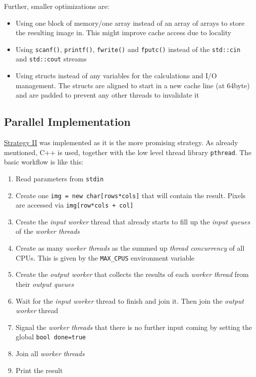 Further, smaller optimizations are:
\begin{itemize}
    \item Using one block of memory/one array instead of an array of arrays to store the resulting image in. This might improve cache access due to locality
    \item Using \verb$scanf()$, \verb$printf()$, \verb$fwrite()$ and \verb$fputc()$ instead of the \verb$std::cin$ and \verb$std::cout$ streams
    \item Using structs instead of any variables for the calculations and I/O management. The structs are aligned to start in a new cache line (at 64byte) and are padded to prevent any other threads to invalidate it
\end{itemize}


\subsection{Parallel Implementation}
\label{ssec:parallel_implementation}

\hyperref[ssec:strategy-ii]{Strategy II} was implemented as it is the more promising strategy. As already mentioned, C++ is used, together with the low level thread library \verb$pthread$. The basic workflow is like this:

\begin{enumerate}
    \item Read parameters from \verb$stdin$
    \item Create one \verb$img = new char[rows*cols]$ that will contain the result. Pixels are accessed via \verb$img[row*cols + col]$
    \item Create the \textit{input worker} thread that already starts to fill up the \textit{input queues} of the \textit{worker threads}
    \item Create as many \textit{worker threads} as the summed up \textit{thread concurrency} of all CPUs. This is given by the \verb$MAX_CPUS$ environment variable
    \item Create the \textit{output worker} that collects the results of each \textit{worker thread} from their \textit{output queues}
    \item Wait for the \textit{input worker} thread to finish and join it. Then join the \textit{output worker} thread
    \item Signal the \textit{worker threads} that there is no further input coming by setting the global \verb$bool done=true$
    \item Join all \textit{worker threads}
    \item Print the result
\end{enumerate}

